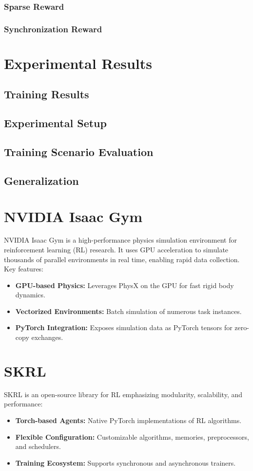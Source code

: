 \documentclass[a4paper,oneside]{book}
\theoremstyle{definition}
\begin{document}
\subsection{Sparse Reward}
\subsection{Synchronization Reward}

\chapter{Experimental Results}
\section{Training Results}

\section{Experimental Setup}

\section{Training Scenario Evaluation}

\section{Generalization}

\chapter{NVIDIA Isaac Gym}
NVIDIA Isaac Gym is a high-performance physics simulation environment for reinforcement learning (RL) research. It uses GPU acceleration to simulate thousands of parallel environments in real time, enabling rapid data collection. Key features:
\begin{itemize}
\item \textbf{GPU-based Physics:} Leverages PhysX on the GPU for fast rigid body dynamics.
\item \textbf{Vectorized Environments:} Batch simulation of numerous task instances.
\item \textbf{PyTorch Integration:} Exposes simulation data as PyTorch tensors for zero-copy exchanges.
\end{itemize}

\chapter{SKRL}
SKRL is an open-source library for RL emphasizing modularity, scalability, and performance:
\begin{itemize}
\item \textbf{Torch-based Agents:} Native PyTorch implementations of RL algorithms.
\item \textbf{Flexible Configuration:} Customizable algorithms, memories, preprocessors, and schedulers.
\item \textbf{Training Ecosystem:} Supports synchronous and asynchronous trainers.
\end{itemize}
\end{document}

